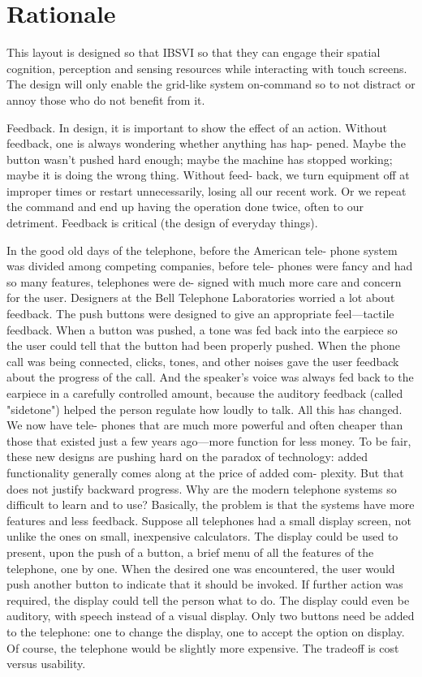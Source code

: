 \documentclass[11pt]{article}
\begin{document}
\section{Rationale}
This layout is designed so that IBSVI so that they can engage their spatial cognition, perception and sensing resources while interacting with touch screens. The design will only enable the grid-like system on-command so to not distract or annoy those who do not benefit from it.

Feedback. In design, it is important to show the effect of an action. Without feedback, one is always wondering whether anything has hap- pened. Maybe the button wasn't pushed hard enough; maybe the machine has stopped working; maybe it is doing the wrong thing. Without feed- back, we turn equipment off at improper times or restart unnecessarily, losing all our recent work. Or we repeat the command and end up having the operation done twice, often to our detriment. Feedback is critical (the design of everyday things).

In the good old days of the telephone, before the American tele- phone system was divided among competing companies, before tele- phones were fancy and had so many features, telephones were de- signed with much more care and concern for the user. Designers at the Bell Telephone Laboratories worried a lot about feedback. The push buttons were designed to give an appropriate feel—tactile feedback. When a button was pushed, a tone was fed back into the earpiece so the user could tell that the button had been properly pushed. When the phone call was being connected, clicks, tones, and other noises gave the user feedback about the progress of the call. And the speaker's voice was always fed back to the earpiece in a carefully controlled amount, because the auditory feedback (called "sidetone") helped the person regulate how loudly to talk. All this has changed. We now have tele- phones that are much more powerful and often cheaper than those that existed just a few years ago—more function for less money. To be fair, these new designs are pushing hard on the paradox of technology: added functionality generally comes along at the price of added com- plexity. But that does not justify backward progress. 
Why are the modern telephone systems so difficult to learn and to use? Basically, the problem is that the systems have more features and less feedback. Suppose all telephones had a small display screen, not unlike the ones on small, inexpensive calculators. The display could be used to present, upon the push of a button, a brief menu of all the features of the telephone, one by one. When the desired one was encountered, the user would push another button to indicate that it should be invoked. If further action was required, the display could tell the person what to do. The display could even be auditory, with speech instead of a visual display. Only two buttons need be added to the 
telephone: one to change the display, one to accept the option on display. Of course, the telephone would be slightly more expensive. The tradeoff is cost versus usability.
\end{document}
